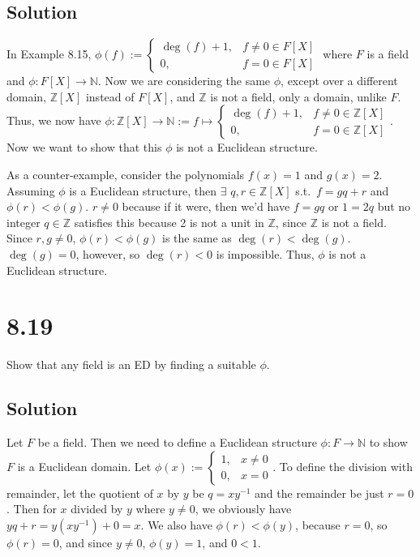 \documentclass[fleqn]{article}
\begin{document}
        \subsection{Solution}
        In Example 8.15, $\phi(f) := \begin{cases}
            \deg(f) + 1, &f \neq 0 \in F[X] \\
            0, &f = 0 \in F[X]
        \end{cases}$ where $F$ is a field and $\phi: F[X] \to \mathbb{N}$.  Now we are considering the same $\phi$, except over a different domain, $\mathbb{Z}[X]$ instead of $F[X]$, and $\mathbb{Z}$ is not a field, only a domain, unlike $F$.  Thus, we now have $\phi: \mathbb{Z}[X] \to \mathbb{N} := f \mapsto \begin{cases}
            \deg(f) + 1, &f \neq 0 \in \mathbb{Z}[X] \\
            0, &f = 0 \in \mathbb{Z}[X]
        \end{cases}$.  Now we want to show that this $\phi$ is not a Euclidean structure.
        
        As a counter-example, consider the polynomials $f(x) = 1$ and $g(x) = 2$.  Assuming $\phi$ is a Euclidean structure, then $\exists$ $q, r \in \mathbb{Z}[X]$ s.t.\ $f = gq + r$ and $\phi(r) < \phi(g)$.  $r \neq 0$ because if it were, then we'd have $f = gq$ or $1 = 2q$ but no integer $q \in \mathbb{Z}$ satisfies this because 2 is not a unit in $\mathbb{Z}$, since $\mathbb{Z}$ is not a field.  Since $r, g \neq 0$, $\phi(r) < \phi(g)$ is the same as $\deg(r) < \deg(g)$.  $\deg(g) = 0$, however, so $\deg(r) < 0$ is impossible.  Thus, $\phi$ is not a Euclidean structure.
    
    \section{8.19}
    Show that any field is an ED by finding a suitable $\phi$.
        
        \subsection{Solution}
        Let $F$ be a field.  Then we need to define a Euclidean structure $\phi: F \to \mathbb{N}$ to show $F$ is a Euclidean domain.  Let $\phi(x) := \begin{cases}
            1, & x \neq 0 \\
            0, & x = 0
        \end{cases}$.  To define the division with remainder, let the quotient of $x$ by $y$ be $q = xy^{-1}$ and the remainder be just $r = 0$.  Then for $x$ divided by $y$ where $y \neq 0$, we obviously have $yq + r = y(xy^{-1}) + 0 = x$.  We also have $\phi(r) < \phi(y)$, because $r = 0$, so $\phi(r) = 0$, and since $y \neq 0$, $\phi(y) = 1$, and $0 < 1$.
    
\end{document}
